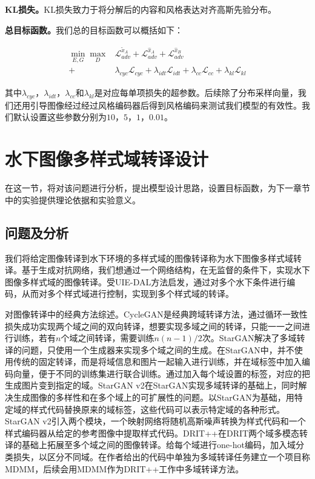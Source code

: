 \textbf{KL损失。}KL损失致力于将分解后的内容和风格表达对齐高斯先验分布。

\textbf{总目标函数。}我们总的目标函数可以概括如下：

\begin{equation}
\label{equ:full}
\begin{aligned}
\min_{E,G}\max_{D} & \mathcal{L}_{adv}^{\tilde{x}_A}+\mathcal{L}_{adv}^{\hat{x}_A}+\mathcal{L}_{adv}^{\hat{x}_B} \\
+&\lambda_{cyc}\mathcal{L}_{cyc}+\lambda_{idt}\mathcal{L}_{idt}+\lambda_{cc}\mathcal{L}_{cc}+\lambda_{kl}\mathcal{L}_{kl}
\end{aligned}
\end{equation}

其中$\lambda_{cyc}$，$\lambda_{idt}$，$\lambda_{cc}$和$\lambda_{kl}$是对应每单项损失的超参数。后续除了分布采样向量，我们还用引导图像经过经过风格编码器后得到风格编码来测试我们模型的有效性。我们默认设置这些参数分别为$10$，$5$，$1$，$0.01$。

\section{水下图像多样式域转译设计}
在这一节，将对该问题进行分析，提出模型设计思路，设置目标函数，为下一章节中的实验提供理论依据和实验意义。

\subsection{问题及分析}
我们将给定图像转译到水下环境的多样式域的图像转译称为水下图像多样式域转译。基于生成对抗网络，我们想通过一个网络结构，在无监督的条件下，实现水下图像多样式域的图像转译。受UIE-DAL方法启发，通过对多个水下条件进行编码，从而对多个样式域进行控制，实现到多个样式域的转译。

对图像转译中的经典方法综述。CycleGAN是经典跨域转译方法，通过循环一致性损失成功实现两个域之间的双向转译，想要实现多域之间的转译，只能一一之间进行训练，若有$n$个域之间转译，需要训练$n(n-1)/2$次。StarGAN解决了多域转译的问题，只使用一个生成器来实现多个域之间的生成。在StarGAN中，并不使用传统的固定转译，而是将域信息和图片一起输入进行训练，并在域标签中加入编码向量，便于不同的训练集进行联合训练。通过加入每个域设置的标签，对应的把生成图片变到指定的域。StarGAN v2在StarGAN实现多域转译的基础上，同时解决生成图像的多样性和在多个域上的可扩展性的问题。以StarGAN为基础，用特定域的样式代码替换原来的域标签，这些代码可以表示特定域的各种形式。StarGAN v2引入两个模块，一个映射网络将随机高斯噪声转换为样式代码和一个样式编码器从给定的参考图像中提取样式代码。DRIT++在DRIT两个域多模态转译的基础上拓展至多个域之间的图像转译。给每个域进行one-hot编码，加入域分类损失，以区分不同域。在作者给出的代码中单独为多域转译任务建立一个项目称MDMM，后续会用MDMM作为DRIT++工作中多域转译方法。

